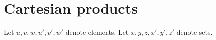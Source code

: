 \documentclass[../../set-theory.ftl.tex]{subfiles}
\begin{document}
  \begin{comment}
    \begin{forthel}

    \end{forthel}
  \end{comment}


  \section{Cartesian products}

  \begin{forthel}
  \end{forthel}

  \begin{forthel}
  \end{forthel}

  \begin{forthel}
    Let $u,v,w,u',v',w'$ denote elements.
    Let $x,y,z,x',y',z'$ denote sets.
  \end{forthel}
\end{document}
